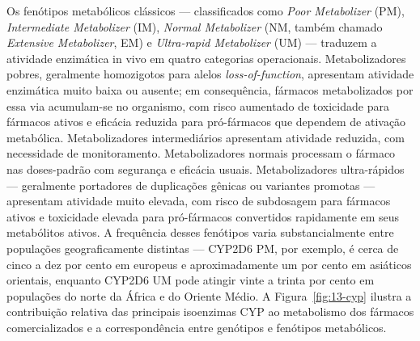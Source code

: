 Os fenótipos metabólicos clássicos --- classificados como \emph{Poor Metabolizer} (PM), \emph{Intermediate Metabolizer} (IM), \emph{Normal Metabolizer} (NM, também chamado \emph{Extensive Metabolizer}, EM) e \emph{Ultra-rapid Metabolizer} (UM) --- traduzem a atividade enzimática in vivo em quatro categorias operacionais. Metabolizadores pobres, geralmente homozigotos para alelos \emph{loss-of-function}, apresentam atividade enzimática muito baixa ou ausente; em consequência, fármacos metabolizados por essa via acumulam-se no organismo, com risco aumentado de toxicidade para fármacos ativos e eficácia reduzida para pró-fármacos que dependem de ativação metabólica. Metabolizadores intermediários apresentam atividade reduzida, com necessidade de monitoramento. Metabolizadores normais processam o fármaco nas doses-padrão com segurança e eficácia usuais. Metabolizadores ultra-rápidos --- geralmente portadores de duplicações gênicas ou variantes promotas --- apresentam atividade muito elevada, com risco de subdosagem para fármacos ativos e toxicidade elevada para pró-fármacos convertidos rapidamente em seus metabólitos ativos. A frequência desses fenótipos varia substancialmente entre populações geograficamente distintas --- CYP2D6 PM, por exemplo, é cerca de cinco a dez por cento em europeus e aproximadamente um por cento em asiáticos orientais, enquanto CYP2D6 UM pode atingir vinte a trinta por cento em populações do norte da África e do Oriente Médio. A Figura~\ref{fig:13-cyp} ilustra a contribuição relativa das principais isoenzimas CYP ao metabolismo dos fármacos comercializados e a correspondência entre genótipos e fenótipos metabólicos.

